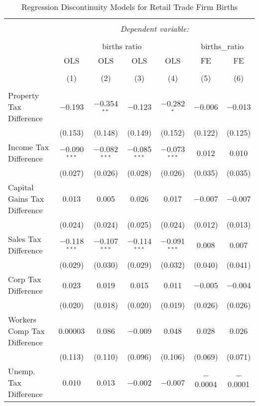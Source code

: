 
\begin{table}[!htbp] \centering 
  \caption{Regression Discontinuity Models for  Retail Trade Firm Births} 
  \label{44-45rd} 
\begin{tabular}{@{\extracolsep{5pt}}lcccccc} 
\\[-1.8ex]\hline 
\hline \\[-1.8ex] 
 & \multicolumn{6}{c}{\textit{Dependent variable:}} \\ 
\cline{2-7} 
\\[-1.8ex] & \multicolumn{4}{c}{births ratio} & \multicolumn{2}{c}{births\_ratio} \\ 
 & OLS & OLS & OLS & OLS & FE & FE \\ 
\\[-1.8ex] & (1) & (2) & (3) & (4) & (5) & (6)\\ 
\hline \\[-1.8ex] 
 Property Tax Difference & $-$0.193 & $-$0.354$^{**}$ & $-$0.123 & $-$0.282$^{*}$ & $-$0.006 & $-$0.013 \\ 
  & (0.153) & (0.148) & (0.149) & (0.152) & (0.122) & (0.125) \\ 
  Income Tax Difference & $-$0.090$^{***}$ & $-$0.082$^{***}$ & $-$0.085$^{***}$ & $-$0.073$^{***}$ & 0.012 & 0.010 \\ 
  & (0.027) & (0.026) & (0.028) & (0.026) & (0.035) & (0.035) \\ 
  Capital Gains Tax Difference & 0.013 & 0.005 & 0.026 & 0.017 & $-$0.007 & $-$0.007 \\ 
  & (0.024) & (0.024) & (0.025) & (0.024) & (0.012) & (0.013) \\ 
  Sales Tax Difference & $-$0.118$^{***}$ & $-$0.107$^{***}$ & $-$0.114$^{***}$ & $-$0.091$^{***}$ & 0.008 & 0.007 \\ 
  & (0.029) & (0.030) & (0.029) & (0.032) & (0.040) & (0.041) \\ 
  Corp Tax Difference & 0.023 & 0.019 & 0.015 & 0.011 & $-$0.005 & $-$0.004 \\ 
  & (0.020) & (0.018) & (0.020) & (0.019) & (0.026) & (0.026) \\ 
  Workers Comp Tax Difference & 0.00003 & 0.086 & $-$0.009 & 0.048 & 0.028 & 0.026 \\ 
  & (0.113) & (0.110) & (0.096) & (0.106) & (0.069) & (0.071) \\ 
  Unemp. Tax Difference & 0.010 & 0.013 & $-$0.002 & $-$0.007 & $-$0.0004 & $-$0.0001 \\ 

\end{tabular}
\end{table}

